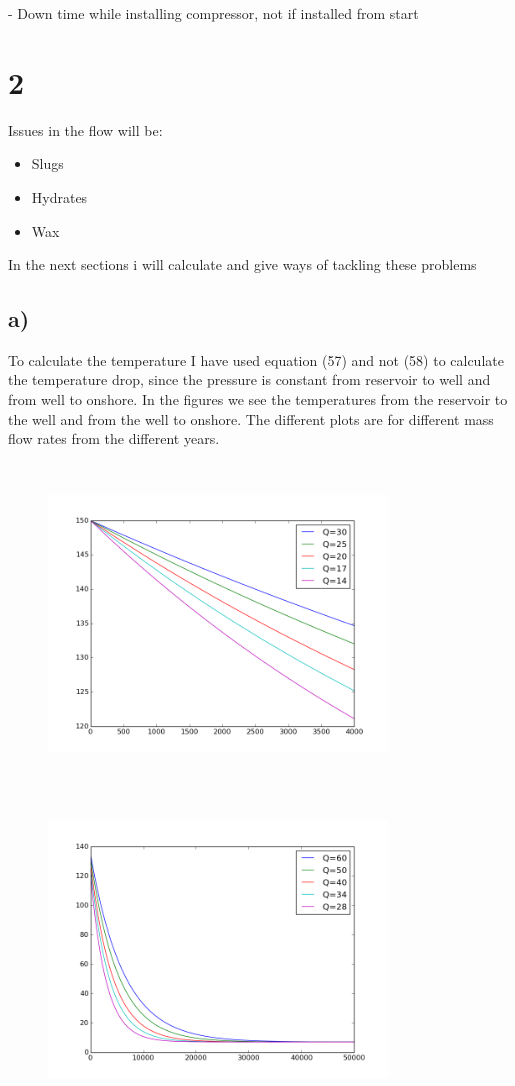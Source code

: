 \documentclass[DIV=calc, paper=a4, fontsize=13pt, twocolumn]{scrartcl}	 %
\begin{document}
- Down time while installing compressor, not if installed from start
\newpage
\section*{2}
Issues in the flow will be:
\begin{itemize}
\item Slugs
\item Hydrates
\item Wax
\end{itemize}
In the next sections i will calculate and give ways of tackling these problems
\subsection*{a)}
To calculate the temperature 
I have used equation (57) and not (58) to calculate the temperature drop, since the pressure is constant from reservoir to well and from well to onshore.
In the figures we see the temperatures from the reservoir to the well and from the well to onshore. The different plots are for different mass flow rates from the different years.
\begin{figure}[h]
\includegraphics[width=9cm,height=8.5cm]{Temp1.png}
\includegraphics[width=9cm,height=8.5cm]{temp2.png}
\end{figure}
\end{document}

